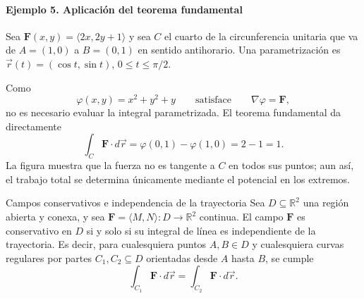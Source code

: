 \begin{samepage}
\paragraph{Ejemplo 5. Aplicación del teorema fundamental}
Sea $\mathbf{F}(x,y)=\langle2x,2y+1\rangle$ y sea $C$ el cuarto de la circunferencia unitaria que va de $A=(1,0)$ a $B=(0,1)$ en sentido antihorario. Una parametrización es $\vec r(t)=(\cos t,\sin t)$, $0\leq t\leq\pi/2$.

\begingroup
\shorthandoff{>}
\begin{center}
\end{center}
\endgroup
\end{samepage}

Como
\[
\varphi(x,y)=x^2+y^2+y
\qquad\text{satisface}\qquad
\nabla\varphi=\mathbf{F},
\]
no es necesario evaluar la integral parametrizada. El teorema fundamental da directamente
\[
\int_C\mathbf{F}\cdot d\vec r
=\varphi(0,1)-\varphi(1,0)
=2-1=1.
\]
La figura muestra que la fuerza no es tangente a $C$ en todos sus puntos; aun así, el trabajo total se determina únicamente mediante el potencial en los extremos.

\begin{mytheorem}{Campos conservativos e independencia de la trayectoria}
Sea $D\subseteq\mathbb R^2$ una región abierta y conexa, y sea $\mathbf{F}=\langle M,N\rangle:D\to\mathbb R^2$ continua. El campo $\mathbf{F}$ es conservativo en $D$ si y solo si su integral de línea es independiente de la trayectoria. Es decir, para cualesquiera puntos $A,B\in D$ y cualesquiera curvas regulares por partes $C_1,C_2\subseteq D$ orientadas desde $A$ hasta $B$, se cumple
\[
\int_{C_1}\mathbf{F}\cdot d\vec r
=\int_{C_2}\mathbf{F}\cdot d\vec r.
\]
\end{mytheorem}


